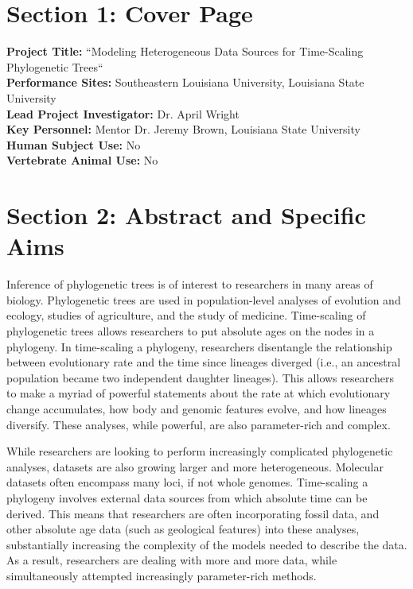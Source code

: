 \documentclass[]{article}
\begin{document}
\setlength{\headsep}{0.1in}
\setlength{\footskip}{10pt}

\section*{Section 1: Cover Page}
\textbf{Project Title:} ``Modeling Heterogeneous Data Sources for Time-Scaling Phylogenetic Trees`` \\
\textbf{Performance Sites:} Southeastern Louisiana University, Louisiana State University \\
\textbf{Lead Project Investigator:} Dr. April Wright \\
\textbf{Key Personnel:} Mentor Dr. Jeremy Brown, Louisiana State University \\
\textbf{Human Subject Use:} No \\
\textbf{Vertebrate Animal Use:} No \\


\newpage
\section*{Section 2: Abstract and Specific Aims}
Inference of phylogenetic trees is of interest to researchers in many areas of biology.
Phylogenetic trees are used in population-level analyses of evolution and ecology, studies of agriculture, and the study of medicine.
Time-scaling of phylogenetic trees allows researchers to put absolute ages on the nodes in a phylogeny. 
In time-scaling a phylogeny, researchers disentangle the relationship between evolutionary rate and the time since lineages diverged (i.e., an ancestral population became two independent daughter lineages). 
This allows researchers to make a myriad of powerful statements about the rate at which evolutionary change accumulates, how body and genomic features evolve, and how lineages diversify. 
These analyses, while powerful, are also parameter-rich and complex. \par

While researchers are looking to perform increasingly complicated phylogenetic analyses, datasets are also growing larger and more heterogeneous. 
Molecular datasets often encompass many loci, if not whole genomes. 
Time-scaling a phylogeny involves external data sources from which absolute time can be derived. 
This means that researchers are often incorporating fossil data, and other absolute age data (such as geological features) into these analyses, substantially increasing the complexity of the models needed to describe the data. 
As a result, researchers are dealing with more and more data, while simultaneously attempted increasingly parameter-rich methods. \par
\end{document}
